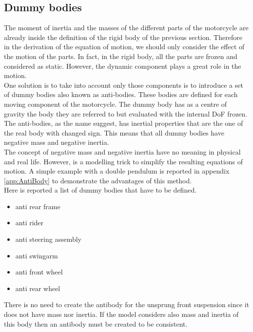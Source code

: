 \subsection{Dummy bodies}
\label{subsec:Dummy}
%
The moment of inertia and the masses of the different parts of the motorcycle are already inside the definition of the rigid body of the previous section. Therefore in the derivation of the equation of motion, we should only consider the effect of the motion of the parts. In fact, in the rigid body, all the parts are frozen and considered as static. However, the dynamic component plays a great role in the motion.\\ 
One solution is to take into account only those components is to introduce a set of dummy bodies also known as anti-bodies. These bodies are defined for each moving component of the motorcycle. The dummy body has as a centre of gravity the body they are referred to but evaluated with the internal DoF frozen. The anti-bodies, as the name suggest, has inertial properties that are the one of the real body with changed sign. This means that all dummy bodies have negative mass and negative inertia. \\
The concept of negative mass and negative inertia have no meaning in physical and real life. However, is a modelling trick to simplify the resulting equations of motion. A simple example with a double pendulum is reported in appendix \ref{app:AntiBody} to demonstrate the advantages of this method.\\
Here is reported a list of dummy bodies that have to be defined.
%
\begin{itemize}
    \setlength{\itemsep}{0pt}
    \item anti rear frame
    \item anti rider 
    \item anti steering assembly
    \item anti swingarm 
    \item anti front wheel
    \item anti rear wheel
\end{itemize}
%
There is no need to create the antibody for the unsprung front suspension since it does not have mass nor inertia. If the model considers also mass and inertia of this body then an antibody must be created to be consistent.
%
